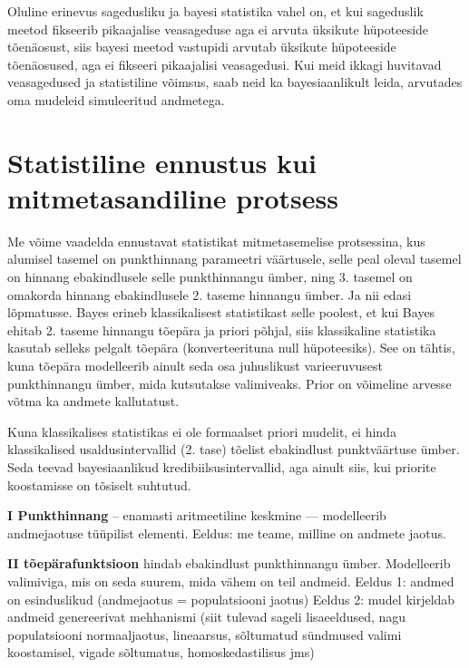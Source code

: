 \documentclass[]{book}
\begin{document}
Oluline erinevus sagedusliku ja bayesi statistika vahel on, et kui
sageduslik meetod fikseerib pikaajalise veasageduse aga ei arvuta
üksikute hüpoteeside tõenäosust, siis bayesi meetod vastupidi arvutab
üksikute hüpoteeside tõenäosused, aga ei fikseeri pikaajalisi
veasagedusi. Kui meid ikkagi huvitavad veasagedused ja statistiline
võimsus, saab neid ka bayesiaanlikult leida, arvutades oma mudeleid
simuleeritud andmetega.

\section*{Statistiline ennustus kui mitmetasandiline
protsess}\label{statistiline-ennustus-kui-mitmetasandiline-protsess-1}

Me võime vaadelda ennustavat statistikat mitmetasemelise protsessina,
kus alumisel tasemel on punkthinnang parameetri väärtusele, selle peal
oleval tasemel on hinnang ebakindlusele selle punkthinnangu ümber, ning
3. tasemel on omakorda hinnang ebakindlusele 2. taseme hinnangu ümber.
Ja nii edasi lõpmatusse. Bayes erineb klassikalisest statistikast selle
poolest, et kui Bayes ehitab 2. taseme hinnangu tõepära ja priori
põhjal, siis klassikaline statistika kasutab selleks pelgalt tõepära
(konverteerituna null hüpoteesiks). See on tähtis, kuna tõepära
modelleerib ainult seda osa juhuslikust varieeruvusest punkthinnangu
ümber, mida kutsutakse valimiveaks. Prior on võimeline arvesse võtma ka
andmete kallutatust.

Kuna klassikalises statistikas ei ole formaalset priori mudelit, ei
hinda klassikalised usaldusintervallid (2. tase) tõelist ebakindlust
punktväärtuse ümber. Seda teevad bayesiaanlikud kredibiilsusintervallid,
aga ainult siis, kui priorite koostamisse on tõsiselt suhtutud.

\textbf{I Punkthinnang} -- enamasti aritmeetiline keskmine ---
modelleerib andmejaotuse tüüpilist elementi. Eeldus: me teame, milline
on andmete jaotus.

\textbf{II tõepärafunktsioon} hindab ebakindlust punkthinnangu ümber.
Modelleerib valimiviga, mis on seda suurem, mida vähem on teil andmeid.
Eeldus 1: andmed on esinduslikud (andmejaotus = populatsiooni jaotus)
Eeldus 2: mudel kirjeldab andmeid genereerivat mehhanismi (siit tulevad
sageli lisaeeldused, nagu populatsiooni normaaljaotus, lineaarsus,
sõltumatud sündmused valimi koostamisel, vigade sõltumatus,
homoskedastilisus jms)
\end{document}
